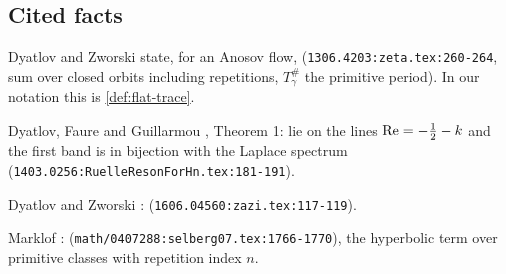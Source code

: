 \subsection{Cited facts}

\begin{citedfact}
\label{cit:dz-guillemin}
Dyatlov and Zworski \cite{dyatlov2016zeta} state, for an Anosov flow,
\texttt{}
(\texttt{1306.4203:zeta.tex:260-264}, sum over closed orbits including
repetitions, $T_\gamma^\#$ the primitive period). In our notation this is
\cref{def:flat-trace}.
\end{citedfact}

\begin{citedfact}
\label{cit:dfg-band}
Dyatlov, Faure and Guillarmou \cite{dyatlov2015power}, Theorem 1:
\texttt{} lie on the
lines $\operatorname{Re} = -\tfrac12 - k$ and the first band is in bijection with the
Laplace spectrum (\texttt{1403.0256:RuelleResonForHn.tex:181-191}).
\end{citedfact}

\begin{citedfact}
\label{cit:dz-ruelle-selberg}
Dyatlov and Zworski \cite{dyatlov2017ruelle}:
\texttt{}
(\texttt{1606.04560:zazi.tex:117-119}).
\end{citedfact}

\begin{citedfact}
\label{cit:marklof-trace}
Marklof \cite{marklof2004selberg}:
\texttt{}
(\texttt{math/0407288:selberg07.tex:1766-1770}), the hyperbolic term over
primitive classes with repetition index $n$.
\end{citedfact}

